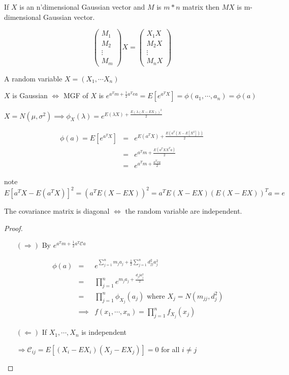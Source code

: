 \begin{lmma*}
	If $X$ is an n'dimensional Gaussian vector and $M$ is $m*n$ matrix then $MX$ is m-dimensional Gaussian vector.
	
	$$\left( \begin{matrix}
	M_1 \\ M_2 \\ \vdots \\ M_m
	\end{matrix}\right)
	X = 
	\left(\begin{matrix}
	X_1X \\ M_2X \\ \vdots \\ M_nX
	\end{matrix}\right)$$
\end{lmma*}

\begin{prop*}
	A random variable $X = (X_1,\cdots X_n)$
	
	$X$ is Gaussian $\Leftrightarrow$ MGF of $X$ is $e^{a^Tm + \frac{1}{2}a^Tea} = E[e^{a^TX}] = \phi(a_1,\cdots,a_n) = \phi(a)$
	
	$X = N(\mu,\sigma^2) \implies \phi_X(\lambda) = e^{E(\lambda X) + \frac{E(\lambda(X - EX))^2}{2}}$
	
	\begin{eqnarray*}
	\phi(a) = E[e^{a^TX}] &=& e^{E(a^TX) + \frac{E(a^T(X-E[X^2]))}{2}} \\
	&=& e^{a^Tm + \frac{E(a^TXX^Ta)}{2}} \\
	&=& e^{a^Tm + \frac{a^Tea}{2}}
	\end{eqnarray*}
	
	note $E[a^TX - E(a^TX)]^2 = (a^TE(X-EX))^2 = a^TE(X - EX)(E(X-EX))^Ta = e$
\end{prop*}

\begin{prop*}
	The covariance matrix is diagonal $\Leftrightarrow$ the random variable are independent.
	
	\begin{proof}
	\begin{enumerate}
	\item[$(\Rightarrow)$] By $e^{a^Tm + \frac{1}{2}a^T\mathscr{C}a}$
	
	\begin{eqnarray*}
		\phi(a) &=& e^{\sum^n_{j=1}m_ja_j + \frac{1}{2}\sum^n_{j=1}d_{jj}^2a_{j}^2} \\
		&=& \prod^n_{j=1}e^{m_ja_j + \frac{d_jja_j^2}{2}} \\
		&=& \prod^n_{j=1}\phi_{X_j}(a_j) \text{ where }X_j = N(m_{jj},d_j^2) \\
		&\implies & f(x_1,\cdots,x_n) = \prod^n_{j=1}f_{X_j}(x_j)
	\end{eqnarray*}	
	\item[$(\Leftarrow)$] If $X_1,\cdots,X_n$ is independent
	
	$\Rightarrow \mathscr{C}_{ij} = E[(X_i - EX_i)(X_j - EX_j)] = 0$ for all $i \neq j$
	
	\end{enumerate}
	\end{proof}
\end{prop*}

